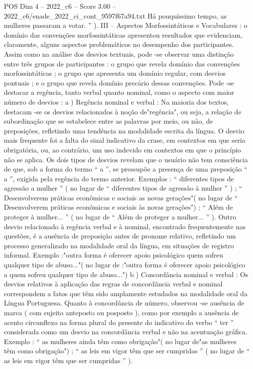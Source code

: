 \begin{textsample}{POS Dim 4 – 2022\_c6 – Score 3.00 – 2022\_c6/enade\_2022\_ci\_cont\_9597f67a94.txt}
Há pouquíssimo tempo, as mulheres passaram a votar. ” ).
III – Aspectos Morfossintáticos e Vocabulares : o domínio das convenções morfossintáticas apresentou resultados que evidenciam, claramente, alguns aspectos problemáticos no desempenho dos participantes.
Assim como na análise dos desvios textuais, pode -se observar uma distinção entre três grupos de participantes : o grupo que revela domínio das convenções morfossintáticas ; o grupo que apresenta um domínio regular, com desvios pontuais ; e o grupo que revela domínio precário dessas convenções.
Pode -se destacar a regência, tanto verbal quanto nominal, como o aspecto com maior número de desvios : a ) Regência nominal e verbal : Na maioria dos textos, destacam -se os desvios relacionados à noção de"regência", ou seja, a relação de subordinação que se estabelece entre as palavras por meio, ou não, de preposições, refletindo uma tendência na modalidade escrita da língua.
O desvio mais frequente foi a falta do sinal indicativo da crase, em contextos em que seria obrigatória, ou, ao contrário, um uso indevido em contextos em que o princípio não se aplica.
Os dois tipos de desvios revelam que o usuário não tem consciência de que, sob a forma do termo “ a ”, se pressupõe a presença de uma preposição “ a ”, exigida pela regência do termo anterior.
Exemplos : “ diferentes tipos de agressão a mulher ” ( no lugar de “ diferentes tipos de agressão à mulher ” ) ; “ Desenvolverem práticas econômicas e sociais as novas gerações"( no lugar de “ Desenvolverem práticas econômicas e sociais às novas gerações") ; “ Além de proteger à mulher... ” ( no lugar de “ Além de proteger a mulher... ” ).
Outro desvio relacionado à regência verbal e à nominal, encontrado frequentemente nas questões, é a ausência de preposição antes de pronome relativo, refletindo um processo generalizado na modalidade oral da língua, em situações de registro informal.
Exemplo :"outra forma é oferecer apoio psicológico quem sofreu qualquer tipo de abuso..."( no lugar de :"outra forma é oferecer apoio psicológico a quem sofreu qualquer tipo de abuso...") b ) Concordância nominal e verbal : Os desvios relativos à aplicação das regras de concordância verbal e nominal correspondem a fatos que têm sido amplamente estudados na modalidade oral da Língua Portuguesa.
Quanto à concordância de número, observou -se ausência de marca ( com sujeito anteposto ou posposto ), como por exemplo a ausência de acento circunflexo na forma plural do presente do indicativo do verbo “ ter ” considerada como um desvio na concordância verbal e não na acentuação gráfica.
Exemplo : “ as mulheres ainda têm como obrigação"( no lugar de"as mulheres têm como obrigação") ; “ as leis em vigor têm que ser cumpridas ” ( no lugar de “ as leis em vigor têm que ser cumpridas ” ).

\end{textsample}
